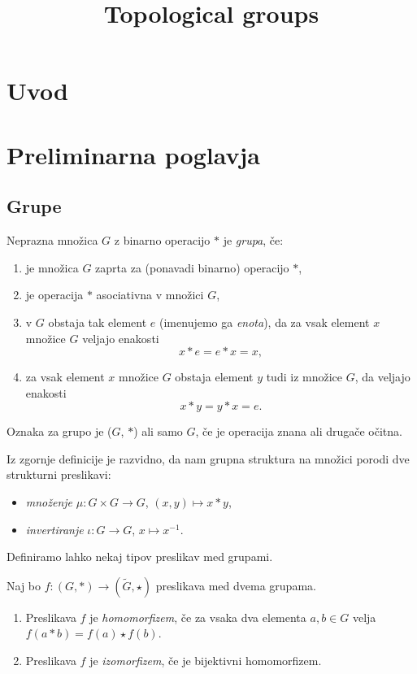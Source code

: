 \documentclass[mat1]{fmfdelo}
\title{Topological groups}
\begin{document}
\section{Uvod}

\section{Preliminarna poglavja}

\subsection{Grupe}
\begin{definicija}\label{def:grupa}
Neprazna množica $G$ z binarno operacijo $*$ je \emph{grupa}, če:
\begin{enumerate}
\item je množica $G$ zaprta za (ponavadi binarno) operacijo $*$,
\item je operacija $*$ asociativna v množici $G$,
\item v $G$ obstaja tak element $e$ (imenujemo ga \emph{enota}), da za vsak element $x$ množice $G$ veljajo enakosti \[ x*e = e*x = x, \]
\item za vsak element $x$ množice $G$ obstaja element $y$ tudi iz množice $G$, da veljajo enakosti \[ x*y = y*x = e. \]
\end{enumerate}
Oznaka za grupo je ($G$, $*$) ali samo $G$, če je operacija znana ali drugače očitna.
\end{definicija}

Iz zgornje definicije je razvidno, da nam grupna struktura na množici porodi dve strukturni preslikavi:
\begin{itemize}
\item \emph{množenje} $\mu: G \times G \to G$, $(x, y) \mapsto x*y$,
\item \emph{invertiranje} $\iota: G \to G$, $x \mapsto x^{-1}$.
\end{itemize}

Definiramo lahko nekaj tipov preslikav med grupami.

\begin{definicija}\label{def:algpreslikave}
Naj bo $f: (G, *) \to (\widetilde{G}, \star)$ preslikava med dvema grupama.
\begin{enumerate}
\item Preslikava $f$ je \emph{homomorfizem}, če za vsaka dva elementa $a, b \in G$ velja $f(a*b) = f(a) \star f(b)$.
\item Preslikava $f$ je \emph{izomorfizem}, če je bijektivni homomorfizem.
\end{enumerate}
\end{definicija}
\end{document}
